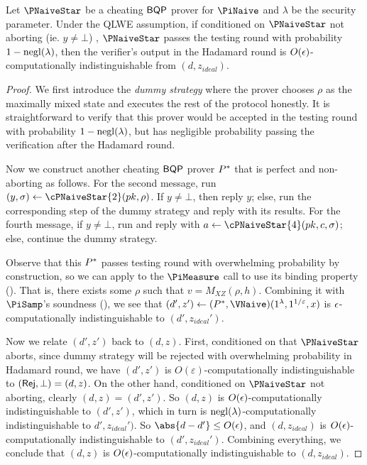 \begin{theorem}
	\label{lem:naive-qpip0-binding}
	Let $\PNaiveStar$ be a cheating $\operatorname{\mathsf{BQP}}$ prover for $\PiNaive$ and $\lambda$ be the security parameter.
	Under the QLWE assumption,  if conditioned on $\PNaiveStar$ not aborting (ie. $y\ne\bot$) , $\PNaiveStar$ passes the testing round with probability $1-\operatorname{negl}(\lambda)$,
	then the verifier's output in the Hadamard round is $O(\epsilon)$-computationally indistinguishable from $(d, z_{ideal})$. 
\end{theorem}
\begin{proof}
	We first introduce the \emph{dummy strategy} where the prover chooses $\rho$ as the maximally mixed state and executes the rest of the protocol honestly.
	It is straightforward to verify that this prover would be accepted in the testing round with probability $1-\operatorname{negl}(\lambda)$,
	but has negligible probability passing the verification after the Hadamard round.

	Now we construct another cheating $\operatorname{\mathsf{BQP}}$ prover $P^*$ that is perfect and non-aborting as follows.
	For the second message, run $(y, \sigma)\leftarrow\cPNaiveStar{2}(pk, \rho)$.
	If $y\ne\bot$, then reply $y$;
	else, run the corresponding step of the dummy strategy and reply with its results.
	For the fourth message, if $y\ne\bot$, run and reply with $a\leftarrow\cPNaiveStar{4}(pk, c, \sigma)$;
	else, continue the dummy strategy.

	Observe that this $P^*$ passes testing round with overwhelming probability by construction,
	so we can apply  to the $\PiMeasure$ call to use its binding property ().
	That is, there exists some $\rho$ such that $v=M_{XZ}(\rho, h)$.
	Combining it with $\PiSamp$'s soundness (),
	we see that $(d', z')\leftarrow(\Pstar, \VNaive)(1^\lambda, 1^{1/\varepsilon}, x)$ is $\epsilon$-computationally indistinguishable to $(d', z_{ideal}')$.

	Now we relate $(d', z')$ back to $(d, z)$.
	First, conditioned on that $\PNaiveStar$ aborts, since dummy strategy will be rejected with overwhelming probability in Hadamard round,
	we have $(d', z')$ is $O(\varepsilon)$-computationally indistinguishable to $(\mathsf{Rej}, \bot)=(d, z)$.
	On the other hand, conditioned on $\PNaiveStar$ not aborting, clearly $(d, z)=(d', z')$.
	So $(d, z)$ is $O(\epsilon)$-computationally indistinguishable to $(d', z')$,
	which in turn is $\operatorname{negl}(\lambda)$-computationally indistinguishable to $d', z_{ideal}')$.
	So $\abs{d-d'}\leq O(\eps)$,
	and $(d, z_{ideal})$ is $O(\epsilon)$-computationally indistinguishable to $(d', z_{ideal}')$.
	Combining everything, we conclude that $(d, z)$ is $O(\epsilon)$-computationally indistinguishable to $(d, z_{ideal})$.
\end{proof}

